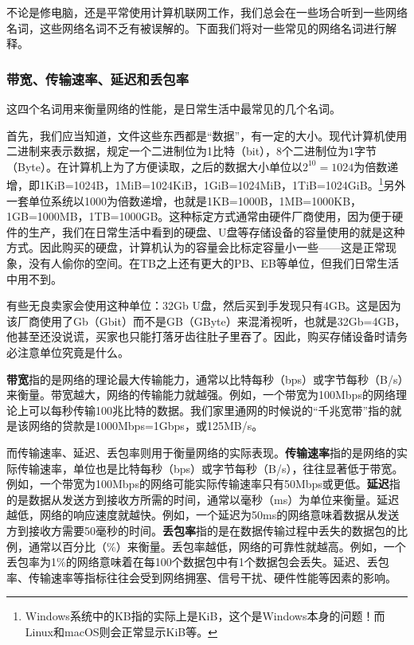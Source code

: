 \documentclass[../main.tex]{subfiles}
\begin{document}
不论是修电脑，还是平常使用计算机联网工作，我们总会在一些场合听到一些网络名词，这些网络名词不乏有被误解的。下面我们将对一些常见的网络名词进行解释。

\subsubsection{带宽、传输速率、延迟和丢包率}

这四个名词用来衡量网络的性能，是日常生活中最常见的几个名词。

首先，我们应当知道，文件这些东西都是“数据”，有一定的大小。现代计算机使用二进制来表示数据，规定一个二进制位为1比特（bit），8个二进制位为1字节（Byte）。在计算机上为了方便读取，之后的数据大小单位以$2^10=1024$为倍数递增，即1KiB=1024B，1MiB=1024KiB，1GiB=1024MiB，1TiB=1024GiB。\footnote{Windows系统中的KB指的实际上是KiB，这个是Windows本身的问题！而Linux和macOS则会正常显示KiB等。}另外一套单位系统以1000为倍数递增，也就是1KB=1000B，1MB=1000KB，1GB=1000MB，1TB=1000GB。这种标定方式通常由硬件厂商使用，因为便于硬件的生产，我们在日常生活中看到的硬盘、U盘等存储设备的容量使用的就是这种方式。因此购买的硬盘，计算机认为的容量会比标定容量小一些——这是正常现象，没有人偷你的空间。在TB之上还有更大的PB、EB等单位，但我们日常生活中用不到。

\begin{caution}
  有些无良卖家会使用这种单位：32Gb U盘，然后买到手发现只有4GB。这是因为该厂商使用了Gb（Gbit）而不是GB（GByte）来混淆视听，也就是32Gb=4GB，他甚至还没说谎，买家也只能打落牙齿往肚子里吞了。因此，购买存储设备时请务必注意单位究竟是什么。
\end{caution}

\textbf{带宽}指的是网络的理论最大传输能力，通常以比特每秒（bps）或字节每秒（B/s）来衡量。带宽越大，网络的传输能力就越强。例如，一个带宽为100Mbps的网络理论上可以每秒传输100兆比特的数据。我们家里通网的时候说的“千兆宽带”指的就是该网络的贷款是1000Mbps=1Gbps，或125MB/s。

而传输速率、延迟、丢包率则用于衡量网络的实际表现。\textbf{传输速率}指的是网络的实际传输速率，单位也是比特每秒（bps）或字节每秒（B/s），往往显著低于带宽。例如，一个带宽为100Mbps的网络可能实际传输速率只有50Mbps或更低。\textbf{延迟}指的是数据从发送方到接收方所需的时间，通常以毫秒（ms）为单位来衡量。延迟越低，网络的响应速度就越快。例如，一个延迟为50ms的网络意味着数据从发送方到接收方需要50毫秒的时间。\textbf{丢包率}指的是在数据传输过程中丢失的数据包的比例，通常以百分比（\%）来衡量。丢包率越低，网络的可靠性就越高。例如，一个丢包率为1\%的网络意味着在每100个数据包中有1个数据包会丢失。延迟、丢包率、传输速率等指标往往会受到网络拥塞、信号干扰、硬件性能等因素的影响。
\end{document}
